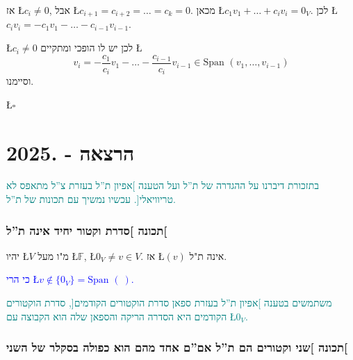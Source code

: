\documentclass[english,hebrew]{article}
\newcommand{\spn}{\text{Span }}
\begin{document}
אז \L{$c_{i}\neq0$}, אבל \L{$c_{i+1}=c_{i+2}=\dots=c_{k}=0$}. מכאן
\L{$c_{1}v_{1}+\dots+c_{i}v_{i}=0_{V}$}. לכן \L{$c_{i}v_{i}=-c_{1}v_{1}-\dots-c_{i-1}v_{i-1}$}.

\L{$c_{i}\neq0$} לכן יש לו הופכי ומתקיים \L{%
\[
v_{i}=-\frac{c_{1}}{c_{i}}v_{1}-\dots-\frac{c_{i-1}}{c_{i}}v_{i-1}\in\spn(v_{1},\dots,v_{i-1})
\]
}%
וסיימנו.
\begin{flushright}
\L{$\square$}
\par\end{flushright}

\newpage{}

\noindent{}

\part{הרצאה {\endL} - {.2025\endL}}

\textcolor{teal}{בתזכורת דיברנו על ההגדרה של ת\textquotedblright ל
ועל הטענה {]}אפיון ת\textquotedblright ל בעזרת צ\textquotedblright ל
מתאפס לא טריוויאלי{[}. עכשיו נמשיך עם תכונות של ת\textquotedblright ל.}

\section{תכונה {]}סדרת וקטור יחיד אינה ת\textquotedblright ל{[}}

יהיו \L{$V$} מ"ו מעל \L{$\mathbb{F}$}, \L{$0_{V}\neq v\in V$}.
אז \L{$(v)$} אינה ת"ל.

\textcolor{blue}{כי הרי \L{$v\notin\{0_{V}\}=\spn(\ )$}.}

\textcolor{teal}{משתמשים בטענה {]}אפיון ת\textquotedblright ל בעזרת
ספאן סדרת הוקטורים הקודמים{[}, סדרת הוקטורים הקודמים היא הסדרה הריקה
והספאן שלה הוא הקבוצה עם \L{$0_{V}$}.}

\section{תכונה {]}שני וקטורים הם ת\textquotedblright ל אם\textquotedblright ם
אחד מהם הוא כפולה בסקלר של השני{[}}
\end{document}
